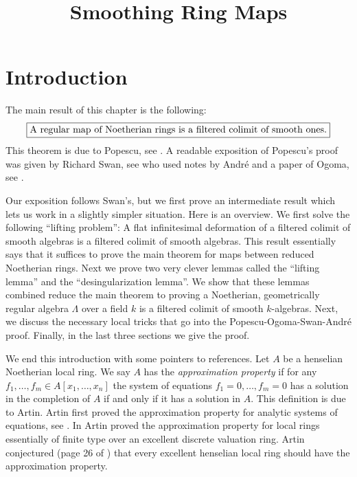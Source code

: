 

%


\title{Smoothing Ring Maps}


\maketitle

\label{section-phantom}

\tableofcontents

\section{Introduction}
\label{section-introduction}

\noindent
The main result of this chapter is the following:
$$
\fbox{A regular map of Noetherian rings is a filtered colimit
of smooth ones.}
$$
This theorem is due to Popescu, see \cite{popescu-letter}.
A readable exposition of Popescu's proof was given by Richard Swan,
see \cite{swan} who used notes by Andr\'e and a paper of Ogoma, see
\cite{Ogoma}.

\medskip\noindent
Our exposition follows Swan's, but we first prove an intermediate result
which lets us work in a slightly simpler situation. Here is an overview.
We first solve the following ``lifting problem'': A flat infinitesimal
deformation of a filtered colimit of smooth algebras is a filtered colimit
of smooth algebras. This result essentially says that it suffices to prove
the main theorem for maps between reduced Noetherian rings. Next we prove
two very clever lemmas called the ``lifting lemma'' and the
``desingularization lemma''. We show that these lemmas combined
reduce the main theorem to proving a Noetherian, geometrically regular
algebra $\Lambda$ over a field $k$ is a filtered colimit of smooth $k$-algebras.
Next, we discuss the necessary local tricks that go into the
Popescu-Ogoma-Swan-Andr\'e proof. Finally, in the last three sections
we give the proof.

\medskip\noindent
We end this introduction with some pointers to references.
Let $A$ be a henselian Noetherian local ring.
We say $A$ has the {\it approximation property} if for any
$f_1, \ldots, f_m \in A[x_1, \ldots, x_n]$ the system of equations
$f_1 = 0, \ldots, f_m = 0$ has a solution in the completion
of $A$ if and only if it has a solution in $A$. This definition
is due to Artin.
Artin first proved the approximation property for analytic systems of
equations, see \cite{Artin-Analytic-Approximation}.
In \cite{Artin-Algebraic-Approximation} Artin proved the
approximation property for local rings
essentially of finite type over an excellent discrete valuation ring.
Artin conjectured (page 26 of \cite{Artin-Algebraic-Approximation})
that every excellent henselian local ring should have the
approximation property.

